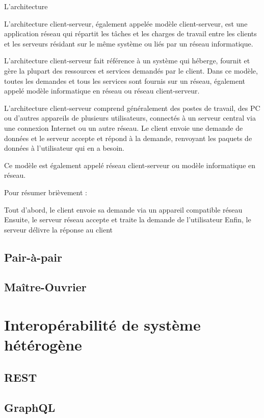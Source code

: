L'architecture


L'architecture client-serveur, également appelée modèle client-serveur, est une application réseau qui répartit les tâches et les charges de travail entre les clients et les serveurs résidant sur le même système ou liés par un réseau informatique.

L'architecture client-serveur fait référence à un système qui héberge, fournit et gère la plupart des ressources et services demandés par le client. Dans ce modèle, toutes les demandes et tous les services sont fournis sur un réseau, également appelé modèle informatique en réseau ou réseau client-serveur. 

L'architecture client-serveur comprend généralement des postes de travail, des PC ou d'autres appareils de plusieurs utilisateurs, connectés à un serveur central via une connexion Internet ou un autre réseau. Le client envoie une demande de données et le serveur accepte et répond à la demande, renvoyant les paquets de données à l'utilisateur qui en a besoin.

Ce modèle est également appelé réseau client-serveur ou modèle informatique en réseau.

Pour résumer brièvement :

Tout d'abord, le client envoie sa demande via un appareil compatible réseau
Ensuite, le serveur réseau accepte et traite la demande de l'utilisateur
Enfin, le serveur délivre la réponse au client

\cite{Terra_2023}
\subsection{Pair-à-pair}

\subsection{Maître-Ouvrier}


\section{Interopérabilité de système hétérogène}

\subsection{REST}

\subsection{GraphQL}

